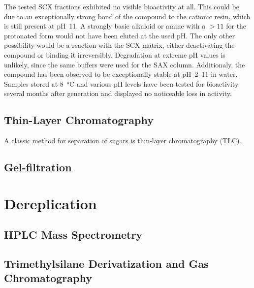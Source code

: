 The tested SCX fractions exhibited no visible bioactivity at all.
This could be due to an exceptionally strong bond of the compound to the cationic resin, which is still present at pH~11.
A strongly basic alkaloid or amine with a \pka$>11$ for the protonated form would not have been eluted at the used pH.
The only other possibility would be a reaction with the SCX matrix, either deactivating the compound or binding it irreversibly.
Degradation at extreme pH values is unlikely, since the same buffers were used for the SAX column.
Additionaly, the compound has been observed to be exceptionally stable at pH~2--11 in water.
Samples stored at \SI{8}{\celsius} and various pH levels have been tested for bioactivity several months after generation and displayed no noticeable loss in activity.


\subsection{Thin-Layer Chromatography} %
\label{sub:results_thin_layer_chromatography}


A classic method for separation of sugars is thin-layer chromatography (TLC).
%


\subsection{Gel-filtration} %
\label{sub:results_gel_filtration}


\section{Dereplication} %
\label{sec:dereplication}

\subsection{HPLC Mass Spectrometry} %
\label{sub:hplc_mass_spectrometry}


\subsection{Trimethylsilane Derivatization and Gas Chromatography} %
\label{sub:trimethylsilane_derivatization_and_gas_chromatography_results}

